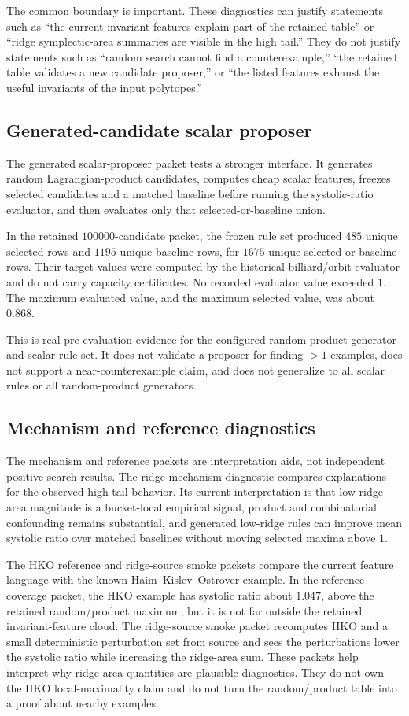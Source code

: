 The common boundary is important.  These diagnostics can justify statements
such as ``the current invariant features explain part of the retained table''
or ``ridge symplectic-area summaries are visible in the high tail.''  They do
not justify statements such as ``random search cannot find a counterexample,''
``the retained table validates a new candidate proposer,'' or ``the listed
features exhaust the useful invariants of the input polytopes.''

\subsection{Generated-candidate scalar proposer}

The generated scalar-proposer packet tests a stronger interface.  It generates
random Lagrangian-product candidates, computes cheap scalar features, freezes
selected candidates and a matched baseline before running the systolic-ratio
evaluator, and then evaluates only that selected-or-baseline union.

In the retained \(100000\)-candidate packet, the frozen rule set produced
\(485\) unique selected rows and \(1195\) unique baseline rows, for \(1675\)
unique selected-or-baseline rows.  Their target values were computed by the
historical billiard/orbit evaluator and do not carry capacity certificates.
No recorded evaluator value exceeded \(1\).
The maximum evaluated value, and the maximum selected value, was about
\(0.868\).

This is real pre-evaluation evidence for the configured random-product
generator and scalar rule set.  It does not validate a proposer for finding
\(>1\) examples, does not support a near-counterexample claim, and does not
generalize to all scalar rules or all random-product generators.

\subsection{Mechanism and reference diagnostics}

The mechanism and reference packets are interpretation aids, not independent
positive search results.  The ridge-mechanism diagnostic compares explanations
for the observed high-tail behavior.  Its current interpretation is that low
ridge-area magnitude is a bucket-local empirical signal, product and
combinatorial confounding remains substantial, and generated low-ridge rules
can improve mean systolic ratio over matched baselines without moving selected
maxima above \(1\).

The HKO reference and ridge-source smoke packets compare the current feature
language with the known Haim--Kislev--Ostrover example.  In the reference
coverage packet, the HKO example has systolic ratio about \(1.047\), above the
retained random/product maximum, but it is not far outside the retained
invariant-feature cloud.  The ridge-source smoke packet recomputes HKO and a
small deterministic perturbation set from source and sees the perturbations
lower the systolic ratio while increasing the ridge-area sum.  These packets
help interpret why ridge-area quantities are plausible diagnostics.  They do
not own the HKO local-maximality claim and do not turn the random/product table
into a proof about nearby examples.
